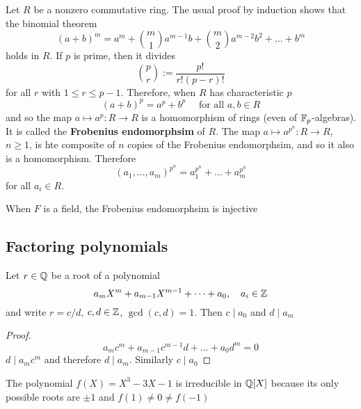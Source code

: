 \documentclass[11pt]{article}
\begin{document}
Let \(R\) be a nonzero commutative ring. The usual proof by induction shows that the binomial
theorem
\begin{equation*}
(a+b)^m=a^m+\binom{m}{1}a^{m-1}b+\binom{m}{2}a^{m-2}b^2+\dots+b^m
\end{equation*}
holds in \(R\). If \(p\) is prime, then it divides
\begin{equation*}
\binom{p}{r}:=\frac{p!}{r!(p-r)!}
\end{equation*}
for all \(r\) with \(1\le r\le p-1\). Therefore, when \(R\) has characteristic \(p\)
\begin{equation*}
(a+b)^p=a^p+b^p\quad\text{ for all }a,b\in R
\end{equation*}
and so the map \(a\mapsto a^p:R\to R\) is a homomorphism of rings (even of \(\mathbb{F}_p\)-algebras). It is
called the \textbf{Frobenius endomorphsim} of \(R\). The map \(a\mapsto a^{p^n}:R\to R\), \(n\ge 1\), is hte
composite of \(n\) copies of the Frobenius endomorphsim, and so it also is a homomorphism.
Therefore
\begin{equation*}
(a_1,\dots,a_m)^{p^n}=a_1^{p^n}+\dots+a_m^{p^n}
\end{equation*}
for all \(a_i\in R\).

When \(F\) is a field, the Frobenius endomorphsim is injective
\subsection{Factoring polynomials}
\label{sec:org7b1afb0}
\begin{proposition}[]
Let \(r\in\mathbb{Q}\) be a root of a polynomial
\begin{equation*}
a_mX^m+a_{m-1}X^{m-1}+\dots+a_0,\quad a_i\in\mathbb{Z}
\end{equation*}
and write \(r=c/d\), \(c,d\in\mathbb{Z}\), \(\gcd(c,d)=1\). Then \(c\mid a_0\) and \(d\mid a_m\)
\end{proposition}

\begin{proof}
\begin{equation*}
a_mc^m+a_{m-1}c^{m-1}d+\dots+a_0d^m=0
\end{equation*}
\(d\mid a_mc^m\) and therefore \(d\mid a_m\). Similarly \(c\mid a_0\)
\end{proof}

\begin{examplle}[]
The polynomial \(f(X)=X^3-3X-1\) is irreducible in \(\mathbb{Q}[X]\) because its only possible roots
are \(\pm 1\) and \(f(1)\neq 0\neq f(-1)\)
\end{examplle}
\end{document}
